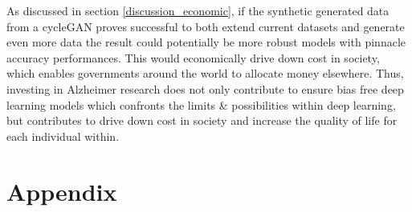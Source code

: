 \documentclass[12pt, fleqn, titlepage]{article}
\newcommand{\1}[1]{\mathds{1}\left[#1\right]}
\begin{document}
As discussed in section \ref{discussion_economic}, if the synthetic generated data from a cycleGAN proves successful to both extend current datasets and generate even more data the result could potentially be more robust models with pinnacle accuracy performances. This would economically drive down cost in society, which enables governments around the world to allocate money elsewhere. Thus, investing in Alzheimer research does not only contribute to ensure bias free deep learning models which confronts the limits \& possibilities within deep learning, but contributes to drive down cost in society and increase the quality of life for each individual within.

\newpage
\section{Appendix}\label{appendix}
\end{document}
